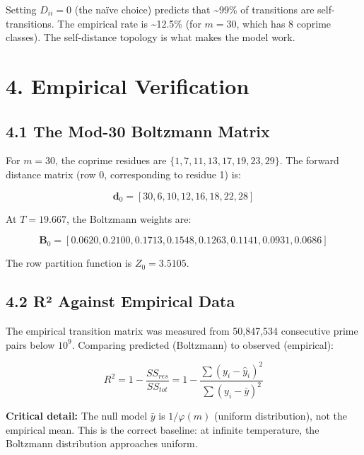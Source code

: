 \documentclass[
  11pt,
]{article}
\numberwithin{equation}{section}
\begin{document}
Setting \(D_{ii} = 0\) (the naïve choice) predicts that
\textasciitilde99\% of transitions are self-transitions. The empirical
rate is \textasciitilde12.5\% (for \(m = 30\), which has 8 coprime
classes). The self-distance topology is what makes the model work.



\setcounter{section}{4}\setcounter{equation}{0}
\setcounter{section}{4}\setcounter{equation}{0}
\section{4. Empirical Verification}\label{empirical-verification}

\subsection{4.1 The Mod-30 Boltzmann
Matrix}\label{the-mod-30-boltzmann-matrix}

For \(m = 30\), the coprime residues are
\(\{1, 7, 11, 13, 17, 19, 23, 29\}\). The forward distance matrix (row
0, corresponding to residue 1) is:

\begin{equation}\mathbf{d}_0 = [30, 6, 10, 12, 16, 18, 22, 28]\end{equation}

At \(T = 19.667\), the Boltzmann weights are:

\begin{equation}\mathbf{B}_0 = [0.0620, 0.2100, 0.1713, 0.1548, 0.1263, 0.1141, 0.0931, 0.0686]\end{equation}

The row partition function is \(Z_0 = 3.5105\).

\subsection{4.2 R² Against Empirical
Data}\label{ruxb2-against-empirical-data}

The empirical transition matrix was measured from 50,847,534 consecutive
prime pairs below \(10^9\). Comparing predicted (Boltzmann) to observed
(empirical):

\begin{equation}R^2 = 1 - \frac{SS_{res}}{SS_{tot}} = 1 - \frac{\sum (y_i - \hat{y}_i)^2}{\sum (y_i - \bar{y})^2}\end{equation}

\textbf{Critical detail:} The null model \(\bar{y}\) is \(1/\varphi(m)\)
(uniform distribution), not the empirical mean. This is the correct
baseline: at infinite temperature, the Boltzmann distribution approaches
uniform.
\end{document}

